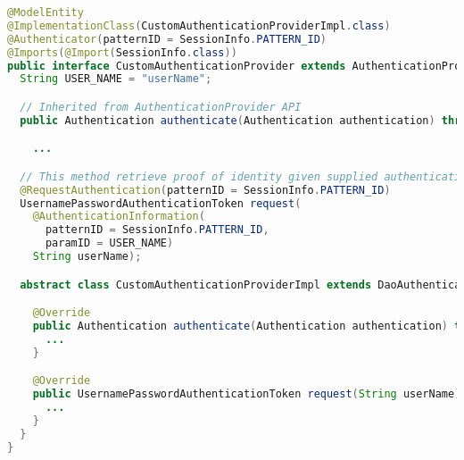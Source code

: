 
\begin{lstlisting}[language=Java,basicstyle=\ttfamily\footnotesize, caption=Mise en oeuvre de l'entité \textit{Authenticator} : \texttt{CustomAuthenticationProvider.java},label=listing:CustomAuthenticationProvider]
@ModelEntity
@ImplementationClass(CustomAuthenticationProviderImpl.class)
@Authenticator(patternID = SessionInfo.PATTERN_ID)
@Imports(@Import(SessionInfo.class))
public interface CustomAuthenticationProvider extends AuthenticationProvider {
  String USER_NAME = "userName";

  // Inherited from AuthenticationProvider API
  public Authentication authenticate(Authentication authentication) throws AuthenticationException;

    ...

  // This method retrieve proof of identity given supplied authentication information
  @RequestAuthentication(patternID = SessionInfo.PATTERN_ID)
  UsernamePasswordAuthenticationToken request(
    @AuthenticationInformation(
      patternID = SessionInfo.PATTERN_ID, 
      paramID = USER_NAME) 
    String userName);

  abstract class CustomAuthenticationProviderImpl extends DaoAuthenticationProvider implements CustomAuthenticationProvider {

    @Override
    public Authentication authenticate(Authentication authentication) throws AuthenticationException {
      ...
    }

    @Override
    public UsernamePasswordAuthenticationToken request(String userName) {
      ...
    }
  }
}
\end{lstlisting}



